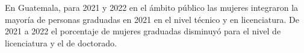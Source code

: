 En Guatemala, para 2021 y 2022 en el ámbito público las mujeres integraron la mayoría de personas graduadas en 2021 en el nivel técnico y en licenciatura. De 2021 a 2022 el porcentaje de mujeres graduadas disminuyó para el nivel de licenciatura y el de doctorado. 
